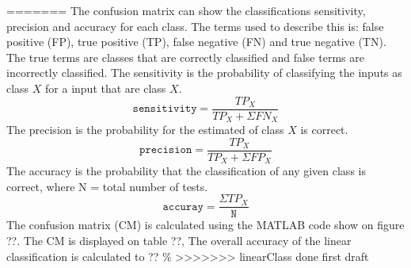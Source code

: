 =======
The confusion matrix can show the classifications sensitivity, precision and accuracy for each class. 
The terms used to describe this is: false positive (FP), true positive (TP), false negative (FN) and true negative (TN).
The true terms are classes that are correctly classified and false terms are incorrectly classified.
The sensitivity is the probability of classifying the inputs as class $X$ for a input that are class $X$.
\begin{equation}
\mathtt{sensitivity} = \dfrac{TP_X}{TP_X+\Sigma FN_X}
\label{eq:sensitivity}
\end{equation}
The precision is the probability for the estimated of class $X$ is correct.
\begin{equation}
\mathtt{precision} = \dfrac{TP_X}{TP_X+\Sigma FP_X}
\label{eq:precision}
\end{equation}
The accuracy is the probability that the classification of any given class is correct, where N = total number of tests.
\begin{equation}
\mathtt{accuray} = \dfrac{\Sigma TP_X}{\mathtt{N}}
\label{eq:accuracy}
\end{equation}
The confusion matrix (CM) is calculated using the MATLAB code show on figure ??. 
The CM is displayed on table ??, The overall accuracy of the linear classification is  calculated to ?? \%
>>>>>>> linearClass done first draft

